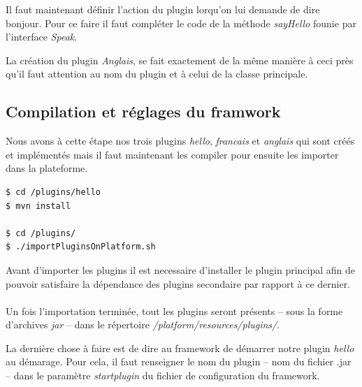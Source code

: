 \documentclass[12pt,a4paper]{article}
\begin{document}
Il faut maintenant définir l'action du plugin lorqu'on lui demande de dire bonjour. 
Pour ce faire il faut compléter le code de la méthode \emph{sayHello} founie par 
l'interface \emph{Speak}.

\lstset{language=java,caption=/plugins/francais/src/main/java/com/francais/Francais.java}


La création du plugin \emph{Anglais}, se fait exactement de la même manière à ceci 
près qu'il faut attention au nom du plugin et à celui de la classe principale.

\subsection{Compilation et réglages du framwork}
Nous avons à cette étape nos trois plugins \emph{hello}, \emph{francais} et 
\emph{anglais} qui sont créés et implémentés mais il faut maintenant les compiler 
pour ensuite les importer dans la plateforme.

\begin{lstlisting}[language=bash,caption=Compilation des plugins]
$ cd /plugins/hello
$ mvn install

$ cd /plugins/
$ ./importPluginsOnPlatform.sh
\end{lstlisting}

Avant d'importer les plugins il est necessaire d'installer le plugin principal 
afin de pouvoir satisfaire la dépendance des plugins secondaire par rapport 
à ce dernier.
\\\\
Un fois l'importation terminée, tout les plugins seront présents -- sous la forme 
d'archives \emph{jar} -- dans le répertoire \emph{/platform/resources/plugins/}.

La dernière chose à faire est de dire au framework de démarrer notre plugin 
\emph{hello} au démarage. Pour cela, il faut renseigner le nom du plugin 
-- nom du fichier .jar -- dans le paramètre \emph{startplugin} du fichier de 
configuration du framework.
\end{document}
